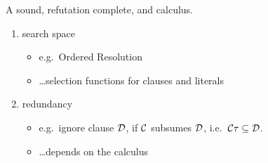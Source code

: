 A sound, refutation complete, and  calculus.
\begin{enumerate}
	\item {} search space
	\begin{itemize}
		\item e.g.~Ordered Resolution
		\item \ldots selection functions for clauses and literals
	\end{itemize}
	\item {} redundancy
	\begin{itemize}
		\item e.g.~ignore clause ${\mathcal D}$, if ${\mathcal C}$ subsumes ${\mathcal D}$, i.e.~${\mathcal C}\tau \subseteq {\mathcal D}$.
		\item \ldots depends on the calculus
	\end{itemize}
\end{enumerate}
\END